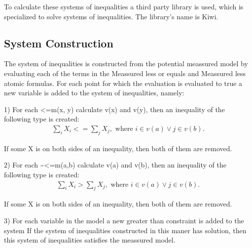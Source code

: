 \documentclass{article}
\begin{document}
		To calculate these systems of inequalities a third party library is used, which is specialized 
		to solve systems of inequalities. The library's name is Kiwi.
		\newline
		\subsection{System Construction}
		The system of inequalities is constructed from the potential meassured model by evaluating each
		of the terms in the Meassured less or equals and Meassured less atomic formulas. For each 
		point for which the evaluation is evaluated to true a new variable is added to the system of inequalities, namely:
		\newline

		1) For each <=m(x, y) calculate v(x) and v(y), then an inequality of the following type is created: 
		\begin{align*}
			\sum_i X_i <= \sum_j X_j, \text{ where }i \in v(a) \vee j \in v(b).
		\end{align*}

		If some X is on both sides of an inequality, then both of them are removed.
		\newline

		2) For each \textasciitilde<=m(a,b) calculate v(a) and v(b), then an inequality of the following type is created: 
		\begin{align*}
			\sum_i X_i > \sum_j X_j, \text{ where }i \in v(a) \vee j \in v(b).
		\end{align*}

		If some X is on both sides of an inequality, then both of them are removed.
		\newline

		3) For each variable in the model a new greater than constraint is added to the system
		\newline
		If the system of inequalities constructed in this maner has solution, then this system of inequalities
		satisfies the meassured model.
\end{document}
